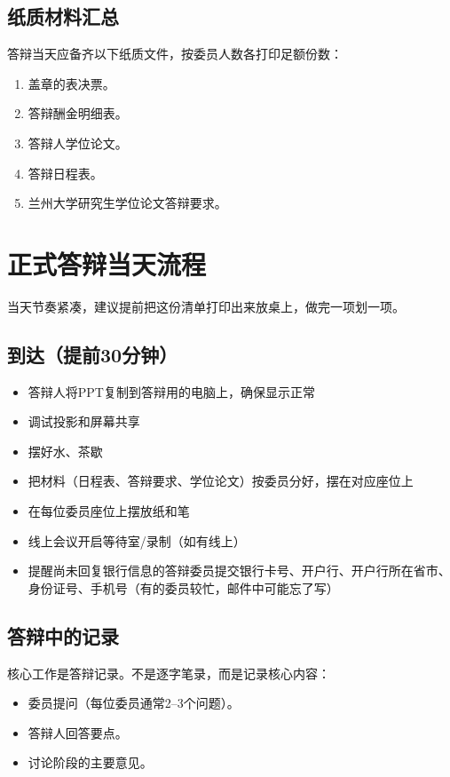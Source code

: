 \documentclass[12pt,a4paper,openany]{ctexbook}
\newcommand{\todoitem}[1]{\item[\textcolor{lzublue}{$\square$}] #1}
\begin{document}
\section{纸质材料汇总}

答辩当天应备齐以下纸质文件，按委员人数各打印足额份数：

\begin{enumerate}
  \item 盖章的表决票。
  \item 答辩酬金明细表。
  \item 答辩人学位论文。
  \item 答辩日程表。
  \item 兰州大学研究生学位论文答辩要求。
\end{enumerate}

\chapter{正式答辩当天流程}

\begin{warnbox}
当天节奏紧凑，建议提前把这份清单打印出来放桌上，做完一项划一项。
\end{warnbox}

\section{到达（提前30分钟）}

\begin{itemize}
  \todoitem{答辩人将PPT复制到答辩用的电脑上，确保显示正常}
  \todoitem{调试投影和屏幕共享}
  \todoitem{摆好水、茶歇}
  \todoitem{把材料（日程表、答辩要求、学位论文）按委员分好，摆在对应座位上}
  \todoitem{在每位委员座位上摆放纸和笔}
  \todoitem{线上会议开启等待室/录制（如有线上）}
  \todoitem{提醒尚未回复银行信息的答辩委员提交银行卡号、开户行、开户行所在省市、身份证号、手机号（有的委员较忙，邮件中可能忘了写）}
\end{itemize}

\section{答辩中的记录}

核心工作是答辩记录。不是逐字笔录，而是记录核心内容：

\begin{itemize}
  \item 委员提问（每位委员通常2--3个问题）。
  \item 答辩人回答要点。
  \item 讨论阶段的主要意见。
\end{itemize}
\end{document}
